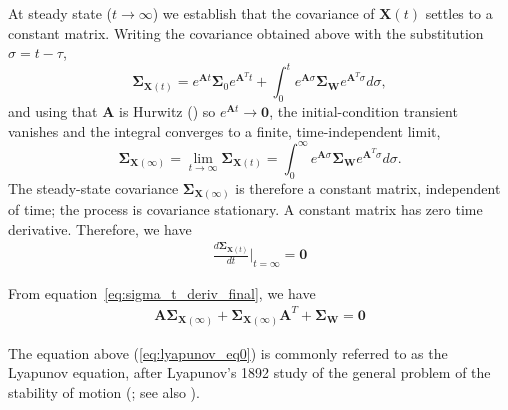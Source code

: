 \documentclass{article}
\begin{document}
At steady state ($t\to\infty$) we establish that the covariance of
$\mathbf{X}(t)$ settles to a constant matrix. Writing the covariance obtained
above with the substitution $\sigma=t-\tau$,
\begin{equation}
\mathbf{\Sigma}_{\mathbf{X}(t)} = e^{\mathbf{A}t} \mathbf{\Sigma}_0 e^{\mathbf{A}^Tt} + \int_0^t e^{\mathbf{A}\sigma}  \mathbf{\Sigma}_\mathbf{W}  e^{\mathbf{A}^T\sigma} d\sigma ,
\end{equation}
and using that $\mathbf{A}$ is Hurwitz (\citealp[Theorem~5.1]{AstromMurray2021}) so
$e^{\mathbf{A}t}\to\mathbf{0}$, the initial-condition transient vanishes and the
integral converges to a finite, time-independent limit,
\begin{equation}
\mathbf{\Sigma}_{\mathbf{X}(\infty)} = \lim_{t\to\infty} \mathbf{\Sigma}_{\mathbf{X}(t)} = \int_0^\infty e^{\mathbf{A}\sigma} \mathbf{\Sigma}_\mathbf{W} e^{\mathbf{A}^T\sigma} d\sigma .
\label{eq:ss_cov_steady}
\end{equation}
The steady-state covariance $\mathbf{\Sigma}_{\mathbf{X}(\infty)}$ is therefore a
constant matrix, independent of time; the process is covariance stationary. A constant matrix has zero time derivative. Therefore, we have
\begin{equation}
\begin{aligned}
{\frac{d \mathbf{\Sigma}_{\mathbf{X}(t)}}{dt}|}_{t=\infty}=\mathbf{0}
\end{aligned}
\end{equation}

From equation~\ref{eq:sigma_t_deriv_final}, we have
\begin{equation}
\begin{aligned}
\mathbf{A} \mathbf{\Sigma}_{\mathbf{X}(\infty)} + \mathbf{\Sigma}_{\mathbf{X}(\infty)} \mathbf{A}^T +\mathbf{\Sigma}_\mathbf{W} =\mathbf{0}
\end{aligned}
\label{eq:lyapunov_eq0}
\end{equation}

The equation above (\ref{eq:lyapunov_eq0}) is commonly referred to as the Lyapunov equation, after Lyapunov's 1892 study of the general problem of the stability of motion (\citealp{Lyapunov1892}; see also \citealp[\S8.5]{Hespanha2018}).




\end{document}
